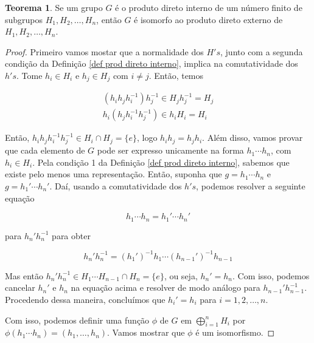 \documentclass[a4paper,portuguese,11pt,twoside, leqno]{book}
\theoremstyle{definition}
\newtheorem{theorem}{Teorema}[section]
\begin{document}
	
	\begin{theorem}
		\label{isomorfismo entre interno e externo}
		Se um grupo $G$ é o produto direto interno de um número finito de subgrupos $H_1, H_2, \dots, H_n$, então $G$ é isomorfo ao produto direto externo de $H_1, H_2, \dots, H_n$.
	\end{theorem}
	
	\begin{proof}
		Primeiro vamos mostar que a normalidade dos $H's$, junto com a segunda condição da Definição \eqref{def prod direto interno}, implica na comutatividade dos $h's$. Tome $h_i\in H_i$ e $h_j\in H_j$ com $i\neq j$. Então, temos
		
		\begin{align*}
		(h_ih_jh_i^{-1})h_j^{-1} \in H_jh_j^{-1} = H_j \\
		h_i(h_jh_i^{-1}h_j^{-1}) \in h_iH_i = H_i
		\end{align*}
		\par\vspace{0.3cm} Então, $h_ih_jh_i^{-1}h_j^{-1}\in H_i\cap H_j = \{e\}$, logo $h_ih_j = h_jh_i$. Além disso, vamos provar que cada elemento de $G$ pode ser expresso unicamente na forma $h_1\cdots h_n$, com $h_i\in H_i$. Pela condição 1 da Definição \eqref{def prod direto interno}, sabemos que existe pelo menos uma representação. Então, suponha que $g = h_1\cdots h_n$ e $g = h_1'\cdots h_n'$. Daí, usando a comutatividade dos $h's$, podemos resolver a seguinte equação
		
		\begin{equation*}
		h_1\cdots h_n = h_1'\cdots h_n'
		\end{equation*}
		
		\par\vspace{0.3cm} para $h_n'h_n^{-1}$ para obter
		
		\begin{equation*}
		h_n'h_n^{-1} = (h_1')^{-1}h_1\cdots (h_{n-1}')^{-1}h_{n-1}
		\end{equation*}
		
		\par\vspace{0.3cm} Mas então $h_n'h_n^{-1}\in H_1\cdots H_{n-1}\cap H_n = \{e\}$, ou seja, $h_n' = h_n$. Com isso, podemos cancelar $h_n'$ e $h_n$ na equação acima e resolver de modo análogo para $h_{n-1}'h_{n-1}^{-1}$. Procedendo dessa maneira, concluímos que $h_i' = h_i$ para $i = 1, 2, \dots, n$.
		
		\par\vspace{0.3cm} Com isso, podemos definir uma função $\phi$ de $G$ em $\displaystyle{\bigoplus_{i = 1}^{n}H_i}$ por $\phi(h_1\cdots h_n) = (h_1, \dots, h_n)$. Vamos mostrar que $\phi$ é um isomorfismo.
		

\end{proof}
\end{document}
